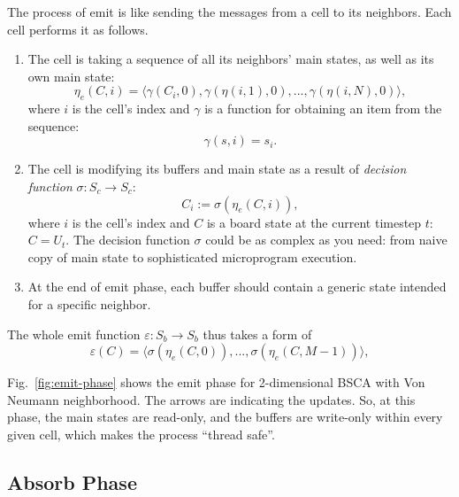 \documentclass[a4paper,12pt,tikz,UTF8]{article}
\begin{document}
    The process of emit is like sending the messages from a cell to its neighbors. Each cell performs it as follows.
    \begin{enumerate}
      \item 
        The cell is taking a sequence of all its neighbors' main states, as well as its own main state:
        \begin{equation}
          \label{eq:neighbors-main-sequence}
          \eta_e(C, i) = \langle \gamma({C_i}, 0), \gamma(\eta(i, 1), 0), ..., \gamma(\eta(i, N), 0) \rangle,
        \end{equation}
        where $i$ is the cell's index and $\gamma$ is a function for obtaining an item from the sequence:
        \begin{equation}
          \label{eq:item-obtaining}
          \gamma(s, i) = s_i.
        \end{equation}
      \item
        The cell is modifying its buffers and main state as a result of \textit{decision function} $\sigma: S_c \to S_c$:
        \begin{equation}
          \label{eq:decision-function}
          C_i := \sigma(\eta_e(C, i)),
        \end{equation}
        where $i$ is the cell's index and $C$ is a board state at the current timestep $t$: $C = U_t$. The decision function $\sigma$ could be as complex as you need: from naive copy of main state to sophisticated microprogram execution.
      \item
        At the end of emit phase, each buffer should contain a generic state intended for a specific neighbor.
    \end{enumerate}

    The whole emit function $\varepsilon: S_b \to S_b$ thus takes a form of
    \begin{equation}
      \varepsilon(C) = \langle \sigma(\eta_e(C, 0)), ..., \sigma(\eta_e(C, M - 1)) \rangle,
    \end{equation}

    Fig.~\ref{fig:emit-phase} shows the emit phase for 2-dimensional BSCA with Von Neumann neighborhood. The arrows are indicating the updates. So, at this phase, the main states are read-only, and the buffers are write-only within every given cell, which makes the process ``thread safe''.

  \subsection{Absorb Phase}
\end{document}
